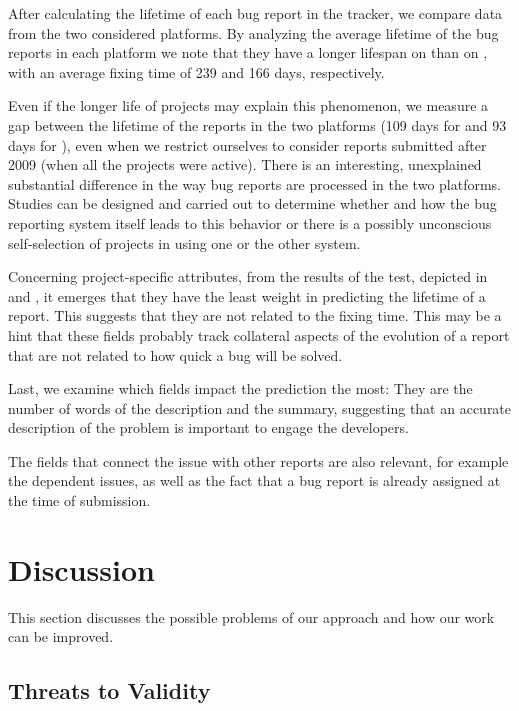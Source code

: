 After calculating the lifetime of each bug report in the tracker, we compare data from the two considered platforms.
By analyzing the average lifetime of the bug reports in each platform we note that they have a longer lifespan on \bzilla than on \jira, with an average fixing time of 239 and 166 days, respectively.

Even if the longer life of \bzilla projects may explain this phenomenon, we measure a gap between the lifetime of the reports in the two platforms (109 days for \bzilla and 93 days for \jira), even when we restrict ourselves to consider reports submitted after 2009 (\ie when all the projects were active).
There is an interesting, unexplained substantial difference in the way bug reports are processed in the two platforms.
Studies can be designed and carried out to determine whether and how the bug reporting system itself leads to this behavior or there is a possibly unconscious self-selection of projects in using one or the other system.

Concerning project-specific attributes, from the results of the test, depicted in  and , it emerges that they have the least weight in predicting the lifetime of a report.
This suggests that they are not related to the fixing time.
This may be a hint that these fields probably track collateral aspects of the evolution of a report that are not related to how quick a bug will be solved.

Last, we examine which fields impact the prediction the most: They are the number of words of the description and the summary, suggesting that an accurate description of the problem is important to engage the developers.

The fields that connect the issue with other reports are also relevant, for example the dependent issues, as well as the fact that a bug report is already assigned at the time of submission.



\section{Discussion}\label{sec:model-discussion}

This section discusses the possible problems of our approach and how our work can be improved.


\subsection{Threats to Validity}

